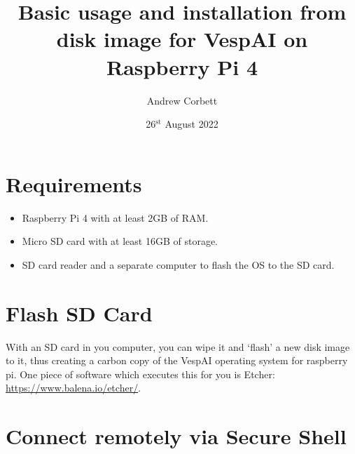 \documentclass[12pt, a4paper, oneside]{article}
\title{Basic usage and installation from disk image for VespAI on Raspberry Pi 4}
\author{Andrew Corbett}
\date{26$^{\mathrm{st}}$ August 2022}
\begin{document}
\maketitle

\section{Requirements}

\begin{itemize}
\item
Raspberry Pi 4 with at least 2GB of RAM.

\item
Micro SD card with at least 16GB of storage.

\item
SD card reader and a separate computer to flash the OS to the SD card.
\end{itemize}


\section{Flash SD Card}

With an SD card in you computer, you can wipe it and `flash' a new disk image to it, thus creating a carbon copy of the VespAI operating system for raspberry pi. One piece of software which executes this for you is Etcher: \url{https://www.balena.io/etcher/}.

\section{Connect remotely via Secure Shell}
\end{document}
